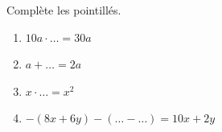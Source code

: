 %
%
    Complète les pointillés.
    \begin{enumerate}
        \item \(10a\cdot \ldots = 30a\)
        \item \(a + \ldots = 2a\)
        \item \(x \cdot \ldots = x^2\)
        \item \(-(8x+6y)- (\ldots - \ldots ) = 10x + 2y\)
    \end{enumerate}
